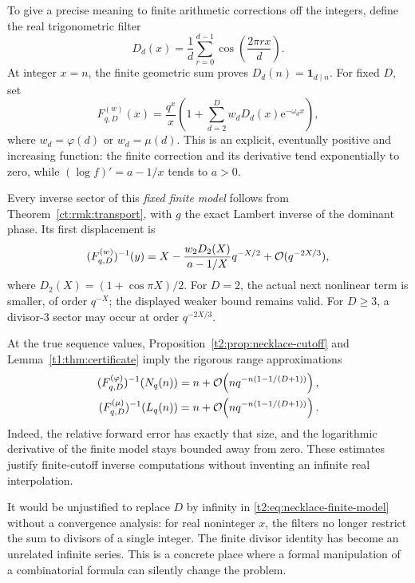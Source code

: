 \documentclass[11pt,openany]{book}
\numberwithin{equation}{chapter}
\theoremstyle{plain}
\theoremstyle{definition}
\theoremstyle{remark}
\newcommand{\ee}{\mathrm e}
\begin{document}
To give a precise meaning to finite arithmetic corrections off the integers, define the real trigonometric filter
\begin{equation}
 D_d(x)=\frac1d\sum_{r=0}^{d-1}\cos\left(\frac{2\pi r x}{d}\right).
 \label{t2:eq:divisibility-filter}
\end{equation}
At integer $x=n$, the finite geometric sum proves $D_d(n)=\mathbf1_{d\mid n}$. For fixed $D$, set
\begin{equation}
 F_{q,D}^{(w)}(x)=\frac{q^x}{x}
       \left(1+\sum_{d=2}^{D}w_dD_d(x)\ee^{-\omega_dx}\right),
 \label{t2:eq:necklace-finite-model}
\end{equation}
where $w_d=\varphi(d)$ or $w_d=\mu(d)$. This is an explicit, eventually positive and increasing function: the finite correction and its derivative tend exponentially to zero, while $(\log f)'=a-1/x$ tends to $a>0$.

Every inverse sector of this \emph{fixed finite model} follows from Theorem~\ref{ct:rmk:transport}, with $g$ the exact Lambert inverse of the dominant phase. Its first displacement is
\begin{equation}
 (F_{q,D}^{(w)})^{-1}(y)
 =X-\frac{w_2D_2(X)}{a-1/X}q^{-X/2}
          +\mathcal O(q^{-2X/3}),
 \label{t2:eq:necklace-finite-inverse}
\end{equation}
where $D_2(X)=(1+\cos\pi X)/2$. For $D=2$, the actual next nonlinear term is smaller, of order $q^{-X}$; the displayed weaker bound remains valid. For $D\ge3$, a divisor-$3$ sector may occur at order $q^{-2X/3}$.

At the true sequence values, Proposition~\ref{t2:prop:necklace-cutoff} and Lemma~\ref{t1:thm:certificate} imply the rigorous range approximations
\begin{align}
 (F_{q,D}^{(\varphi)})^{-1}(N_q(n))
 &=n+\mathcal O\!\left(nq^{-n(1-1/(D+1))}\right),\nonumber\\
 (F_{q,D}^{(\mu)})^{-1}(L_q(n))
 &=n+\mathcal O\!\left(nq^{-n(1-1/(D+1))}\right).
 \label{t2:eq:necklace-range}
\end{align}
Indeed, the relative forward error has exactly that size, and the logarithmic derivative of the finite model stays bounded away from zero. These estimates justify finite-cutoff inverse computations without inventing an infinite real interpolation.

It would be unjustified to replace $D$ by infinity in \eqref{t2:eq:necklace-finite-model} without a convergence analysis: for real noninteger $x$, the filters no longer restrict the sum to divisors of a single integer. The finite divisor identity has become an unrelated infinite series. This is a concrete place where a formal manipulation of a combinatorial formula can silently change the problem.
\end{document}
